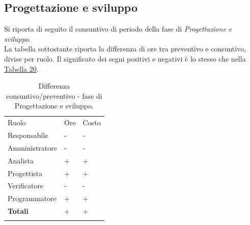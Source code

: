 \documentclass[a4paper]{article}
\begin{document}
			\subsection{Progettazione e sviluppo}
                Si riporta di seguito il consuntivo di periodo della fase di \emph{Progettazione e sviluppo}. \\
                La tabella sottostante riporta la differenza di ore tra preventivo e consuntivo, divise per ruolo. Il significato dei segni
                positivi e negativi è lo stesso che nella \hyperref[DCSceltaCapitolato]{Tabella 20}.
                \begin{table}[H]
					\begin{tabularx}{\textwidth}{Y Y Y}
						Ruolo & Ore & Costo \\
						Responsabile & - & - \\
						Amministratore & - & - \\
						Analista & + & + \\
						Progettista & + & + \\
						Verificatore & - & - \\
						Programmatore & + & + \\
						\textbf{Totali} & + & + \\
					\end{tabularx}
					\caption{Differenza consuntivo/preventivo - fase di Progettazione e sviluppo. } 
					\label{ConsuntivoSviluppo}
				\end{table}
				
\end{document}
